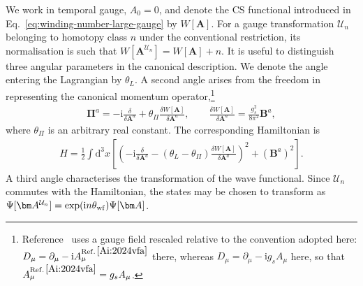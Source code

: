 \documentclass[review]{elsarticle}
\numberwithin{equation}{section}
\numberwithin{table}{section}
\numberwithin{figure}{section}
\def\d{\mathrm{d}}
\def\i{\mathrm{i}}
\begin{document}
We work in temporal gauge, $A_0=0$, and denote the CS functional introduced in Eq.~\eqref{eq:winding-number-large-gauge} by $W[\bm A]$. For a gauge transformation $\mathcal U_n$ belonging to homotopy class $n$ under the conventional restriction, its normalisation is such that $W[\bm A^{\mathcal U_n}]=W[\bm A]+n$. It is useful to distinguish three angular parameters in the canonical description. We denote the angle entering the Lagrangian by $\theta_L$. A second angle arises from the freedom in representing the canonical momentum operator,\footnote{Reference~\cite{Ai:2024vfa} uses a gauge field rescaled relative to the convention adopted here: $D_\mu=\partial_\mu-\i A_\mu^{\rm Ref.\,\cite{Ai:2024vfa}}$ there, whereas $D_\mu=\partial_\mu-\i g_sA_\mu$ here, so that $A_\mu^{\rm Ref.\,\cite{Ai:2024vfa}}=g_sA_\mu$.}
\begin{align}
    \bm\Pi^a
    =
    -\i\frac{\delta}{\delta\bm A^a}
    +
    \theta_\Pi
    \frac{\delta W[\bm A]}{\delta\bm A^a},
    \qquad
    \frac{\delta W[\bm A]}{\delta\bm A^a}
    =
    \frac{g_s^2}{8\pi^2}\bm B^a,
    \label{eq:canonical-momentum-thetaPi}
\end{align}
where $\theta_\Pi$ is an arbitrary real constant. The corresponding Hamiltonian is
\begin{align}
    H
    =
    \frac{1}{2}
    \int\d^3x
    \left[
        \left(
            -\i\frac{\delta}{\delta\bm A^a}
            -
            (\theta_L-\theta_\Pi)
            \frac{\delta W[\bm A]}{\delta\bm A^a}
        \right)^2
        +
        (\bm B^a)^2
    \right].
    \label{eq:canonical-Hamiltonian-theta}
\end{align}
A third angle characterises the transformation of the wave functional. Since $\mathcal U_n$ commutes with the Hamiltonian, the states may be chosen to transform as $\Psi[\bm A^{\mathcal U_n}]=\exp(\i n\theta_{\rm wf})\Psi[\bm A]$.
\end{document}
